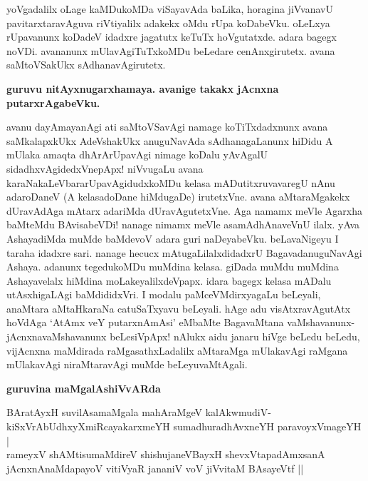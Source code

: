 yoVgadalilx oLage kaMDukoMDa viSayavAda baLika, horagina jiVvanavU pavitarxtaravAguva riVti\-yalilx adakekx oMdu rUpa koDabeVku. oLeLxya rUpavanunx koDadeV idadxre jagatutx keTuTx hoVgutatxde. adara bagegx noVDi. avananunx mUlavAgiTuTxkoMDu beLedare cenAnxgirutetx. avana saMtoVSakUkx sAdhana\-vAgirutetx.

\newpage

{\bigskip
\noindent
{\large\bf guruvu nitAyxnugarxhamaya. avanige takakx jAcnxna putarxrAgabeVku.}}
\medskip

\noindent
avanu dayAmayanAgi ati saMtoVSavAgi namage koTiTxdadxnunx avana saMkalapxkUkx AdeVshakUkx anu\-guNa\-vAda sAdhanagaLanunx hiDidu A mUlaka amaqta dhArArUpavAgi nimage koDalu yAvA\-galU sidadhxvAgidedxVnepApx! niVvugaLu avana karaNakaLeVbararUpavAgidudxkoMDu kelasa mADutitxruvava\-regU nAnu adaroDaneV (A kelasadoDane hiMdugaDe) irutetxVne. avana aMtaraMgakekx dUravAdAga mAtarx adariMda dUravAgutetxVne. Aga namamx meVle Agarxha baMteMdu BAvisabeVDi! nanage nimamx meVle asamA\-dhAna\-veVnU ilalx. yAva AshayadiMda muMde baMdevoV adara guri naDeyabeVku. beLavaNi\-geyu I taraha idadxre sari. nanage hecucx mAtugaLilalxdidadxrU BagavadanuguNavAgi Ashaya. adanunx tegedu\-koMDu muMdina kelasa. giDada muMdu muMdina Ashayavelalx hiMdina moLakeyalilxdeVpapx. idara bagegx kelasa mADalu utAsxhigaLAgi baMdididxVri. I modalu paMceVMdirxyagaLu beLeyali, anaMtara aMtaHkaraNa catuSaTxyavu beLeyali. hAge adu visAtxravAgutAtx hoVdAga `AtAmx veY putarxnAmAsi'\label{75} eMbaMte BagavaMtana vaMshavanunx-jAcnxnavaMshavanunx beLesiVpApx! nAlukx aidu janaru hiVge beLedu beLedu, vijAcnxna maMdirada raMgasathxLadalilx aMtaraMga mUlakavAgi raMgana mUlakavAgi niraMtaravAgi muMde beLeyuvaMtAgali.

{\bigskip
\noindent
{\large\bf guruvina maMgalAshiVvARda}}\label{page75}
\medskip

\noindent
\begin{shloka}
BAratAyxH suvilAsamaMgala mahAraMgeV kalAkwmudiV-\\\label{75}
kiSxVrAbUdhxyXmiRcayakarxmeYH sumadhuradhAvxneYH paravoyxVmageYH |\\
rameyxV shAMtisumaMdireV shishujaneVBayxH shevxVtapadAmxsanA\\
jAcnxnAnaMdapayoV vitiVyaR jananiV voV jiVvitaM BAsayeVtf ||
\end{shloka}
\medskip

